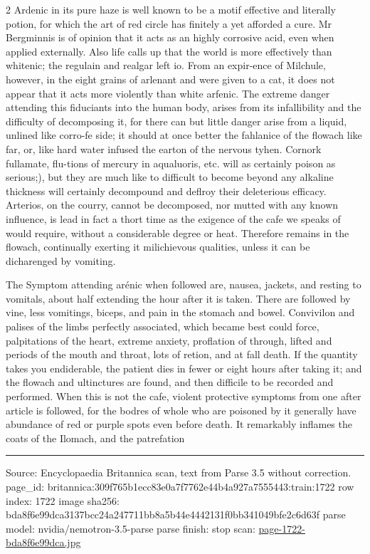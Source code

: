 \documentclass[10pt]{article}
\begin{document}
\begin{multicols}{2}
Ardenic in its pure haze is well known to be a motif effective and literally potion, for which the art of red circle has finitely a yet afforded a cure. Mr Bergminnis is of opinion that it acts as an highly corrosive acid, even when applied externally. Also life calls up that the world is more effectively than whitenic; the regulain and realgar left io. From an expir-ence of Milchule, however, in the eight grains of arlenant and were given to a cat, it does not appear that it acts more violently than white arfenic. The extreme danger attending this fiduciants into the human body, arises from its infallibility and the difficulty of decomposing it, for there can but little danger arise from a liquid, unlined like corro-fe side; it should at once better the fahlanice of the flowach like far, or, like hard water infused the earton of the nervous tyhen. Cornork fullamate, flu-tions of mercury in aqualuoris, etc. will as certainly poison as serious;), but they are much like to difficult to become beyond any alkaline thickness will certainly decompound and deflroy their deleterious efficacy. Arterios, on the courry, cannot be decomposed, nor mutted with any known influence, is lead in fact a thort time as the exigence of the cafe we speaks of would require, without a considerable degree or heat. Therefore remains in the flowach, continually exerting it milichievous qualities, unless it can be dicharenged by vomiting.

The Symptom attending arénic when followed are, nausea, jackets, and resting to vomitals, about half extending the hour after it is taken. There are followed by vine, less vomitings, biceps, and pain in the stomach and bowel. Convivilon and palises of the limbs perfectly associated, which became best could force, palpitations of the heart, extreme anxiety, proflation of through, lifted and periods of the mouth and throat, lots of retion, and at fall death. If the quantity takes you endiderable, the patient dies in fewer or eight hours after taking it; and the flowach and ultinctures are found, and then difficile to be recorded and performed. When this is not the cafe, violent protective symptoms from one after article is followed, for the bodres of whole who are poisoned by it generally have abundance of red or purple spots even before death. It remarkably inflames the coats of the Ilomach, and the patrefation

\end{multicols}
\vfill\par\noindent\rule{\linewidth}{0.4pt}\par
{\scriptsize\color{gray}\noindent Source: Encyclopaedia Britannica scan, text from Parse 3.5 without correction. page\_id: britannica:309f765b1ecc83e0a7f7762e44b4a927a7555443:train:1722 \quad row index: 1722 \quad image sha256: bda8f6e99dca3137bcc24a247711bb8a5b44e4442131f0bb341049bfe2c6d63f \quad parse model: nvidia/nemotron-3.5-parse \quad parse finish: stop \quad scan: \href{../scans/page-1722-bda8f6e99dca.jpg}{page-1722-bda8f6e99dca.jpg}\par}
\end{document}
